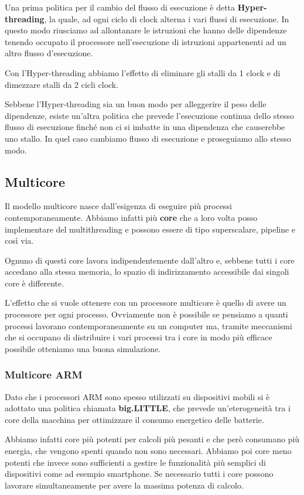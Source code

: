 Una prima politica per il cambio del flusso di esecuzione è detta \textbf{Hyper-threading}, la
quale, ad ogni ciclo di clock alterna i vari flussi di esecuzione. In questo modo riusciamo ad
allontanare le istruzioni che hanno delle dipendenze tenendo occupato il processore nell'esecuzione
di istruzioni appartenenti ad un altro flusso d'esecuzione.

Con l'Hyper-threading abbiamo l'effetto di eliminare gli stalli da 1 clock e di dimezzare stalli da
2 cicli clock.

Sebbene l'Hyper-threading sia un buon modo per alleggerire il peso delle dipendenze, esiste un'altra
politica che prevede l'esecuzione continua dello stesso flusso di esecuzione finché non ci si
imbatte in una dipendenza che causerebbe uno stallo. In quel caso cambiamo flusso di esecuzione e
proseguiamo allo stesso modo.

\subsection{Multicore}
Il modello multicore nasce dall'esigenza di eseguire più processi contemporaneamente. Abbiamo
infatti più \textbf{core} che a loro volta posso implementare del multithreading e possono essere
di tipo superscalare, pipeline e così via.

Ognuno di questi core lavora indipendentemente dall'altro e, sebbene tutti i core accedano alla
stessa memoria, lo spazio di indirizzamento accessibile dai singoli core è differente.

L'effetto che si vuole ottenere con un processore multicore è quello di avere un processore per
ogni processo. Ovviamente non è possibile se pensiamo a quanti processi lavorano contemporaneamente
su un computer ma, tramite meccanismi che si occupano di distribuire i vari processi tra i core in
modo più efficace possibile otteniamo una buona simulazione.

\subsubsection{Multicore ARM}
Dato che i processori ARM sono spesso utilizzati su dispositivi mobili si è adottato una politica
chiamata \textbf{big.LITTLE}, che prevede un'eterogeneità tra i core della macchina per ottimizzare
il consumo energetico delle batterie.

Abbiamo infatti core più potenti per calcoli più pesanti e che però consumano più energia, che
vengono spenti quando non sono necessari. Abbiamo poi core meno potenti che invece sono sufficienti
a gestire le funzionalità più semplici di dispositivi come ad esempio smartphone. Se necessario
tutti i core possono lavorare simultaneamente per avere la massima potenza di calcolo.
